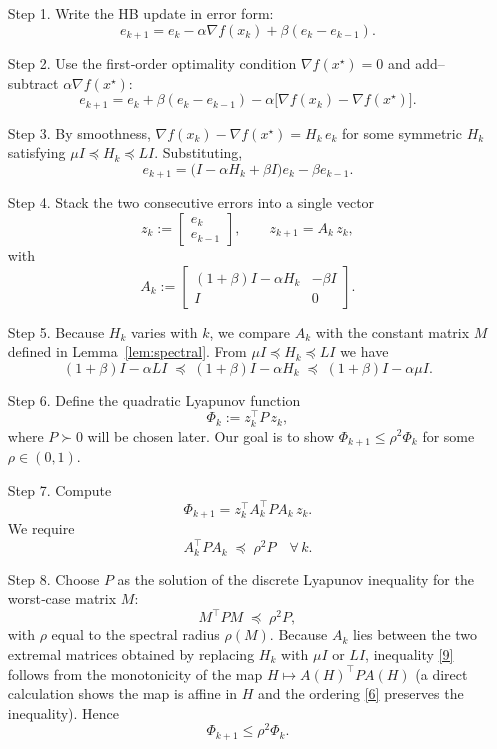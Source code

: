 \documentclass{article}
\begin{document}
\begin{enumerate}
\item[Step 1.]  Write the HB update in error form:
\[
e_{k+1}=e_{k}-\alpha \nabla f(x_{k})+\beta(e_{k}-e_{k-1}).
\tag{1}
\]

\item[Step 2.]  Use the first‑order optimality condition $\nabla f(x^{\star})=0$ and add–subtract $\alpha\nabla f(x^{\star})$:
\[
e_{k+1}=e_{k}+\beta(e_{k}-e_{k-1})-\alpha\bigl[\nabla f(x_{k})-\nabla f(x^{\star})\bigr].
\tag{2}
\]

\item[Step 3.]  By smoothness, $\nabla f(x_{k})-\nabla f(x^{\star}) = H_{k}\,e_{k}$ for some symmetric $H_{k}$ satisfying $\mu I\preceq H_{k}\preceq L I$.  Substituting,
\[
e_{k+1}= \bigl(I-\alpha H_{k}+\beta I\bigr)e_{k}-\beta e_{k-1}.
\tag{3}
\]

\item[Step 4.]  Stack the two consecutive errors into a single vector
\[
z_{k}:=
\begin{bmatrix}e_{k}\\ e_{k-1}\end{bmatrix},
\qquad
z_{k+1}=A_{k}\,z_{k},
\tag{4}
\]
with
\[
A_{k}:=
\begin{bmatrix}
(1+\beta)I-\alpha H_{k} & -\beta I\\[1mm]
I & 0
\end{bmatrix}.
\tag{5}
\]

\item[Step 5.]  Because $H_{k}$ varies with $k$, we compare $A_{k}$ with the constant matrix $M$ defined in Lemma~\ref{lem:spectral}.  From $\mu I\preceq H_{k}\preceq L I$ we have
\[
(1+\beta)I-\alpha L I\;\preceq\;(1+\beta)I-\alpha H_{k}\;\preceq\;(1+\beta)I-\alpha\mu I .
\tag{6}
\]

\item[Step 6.]  Define the quadratic Lyapunov function
\[
\Phi_{k}:=z_{k}^{\top}P\,z_{k},
\tag{7}
\]
where $P\succ0$ will be chosen later.  Our goal is to show $\Phi_{k+1}\le\rho^{2}\Phi_{k}$ for some $\rho\in(0,1)$.

\item[Step 7.]  Compute
\[
\Phi_{k+1}=z_{k}^{\top}A_{k}^{\top}PA_{k}\,z_{k}.
\tag{8}
\]
We require
\[
A_{k}^{\top}PA_{k}\;\preceq\;\rho^{2}P\quad\forall\,k.
\tag{9}
\]

\item[Step 8.]  Choose $P$ as the solution of the discrete Lyapunov inequality for the worst‑case matrix $M$:
\[
M^{\top}PM\;\preceq\;\rho^{2}P,
\tag{10}
\]
with $\rho$ equal to the spectral radius $\rho(M)$.  Because $A_{k}$ lies between the two extremal matrices obtained by replacing $H_{k}$ with $\mu I$ or $L I$, inequality \eqref{9} follows from the monotonicity of the map $H\mapsto A(H)^{\top}PA(H)$ (a direct calculation shows the map is affine in $H$ and the ordering \eqref{6} preserves the inequality).  Hence
\[
\Phi_{k+1}\le\rho^{2}\Phi_{k}.
\tag{11}
\]


\end{enumerate}
\end{document}
